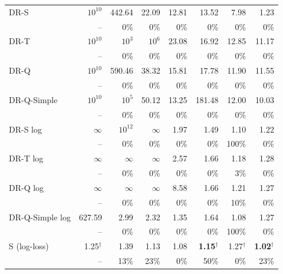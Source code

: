 \documentclass{article}
\begin{document}
\begin{table}[H]
\begin{tabular}{l|rrrrrrr}
\hline
DR-S & $10^{10}$ & 442.64 & 22.09 & 12.81 & 13.52 & 7.98 & 1.23 \\
 & \scriptsize -- & \scriptsize 0\% & \scriptsize 0\% & \scriptsize 0\% & \scriptsize 0\% & \scriptsize 0\% & \scriptsize 0\% \\[2pt]
DR-T & $10^{10}$ & $10^{3}$ & $10^{6}$ & 23.08 & 16.92 & 12.85 & 11.17 \\
 & \scriptsize -- & \scriptsize 0\% & \scriptsize 0\% & \scriptsize 0\% & \scriptsize 0\% & \scriptsize 0\% & \scriptsize 0\% \\[2pt]
DR-Q & $10^{10}$ & 590.46 & 38.32 & 15.81 & 17.78 & 11.90 & 11.55 \\
 & \scriptsize -- & \scriptsize 0\% & \scriptsize 0\% & \scriptsize 0\% & \scriptsize 0\% & \scriptsize 0\% & \scriptsize 0\% \\[2pt]
DR-Q-Simple & $10^{10}$ & $10^{5}$ & 50.12 & 13.25 & 181.48 & 12.00 & 10.03 \\
 & \scriptsize -- & \scriptsize 0\% & \scriptsize 0\% & \scriptsize 0\% & \scriptsize 0\% & \scriptsize 0\% & \scriptsize 0\% \\[2pt]
\hline
DR-S log & $\infty$ & $10^{12}$ & $\infty$ & 1.97 & 1.49 & 1.10 & 1.22 \\
 & \scriptsize -- & \scriptsize 0\% & \scriptsize 0\% & \scriptsize 0\% & \scriptsize 0\% & \scriptsize 100\% & \scriptsize 0\% \\[2pt]
DR-T log & $\infty$ & $\infty$ & $\infty$ & 2.57 & 1.66 & 1.18 & 1.28 \\
 & \scriptsize -- & \scriptsize 0\% & \scriptsize 0\% & \scriptsize 0\% & \scriptsize 0\% & \scriptsize 3\% & \scriptsize 0\% \\[2pt]
DR-Q log & $\infty$ & $\infty$ & $\infty$ & 8.58 & 1.66 & 1.21 & 1.27 \\
 & \scriptsize -- & \scriptsize 0\% & \scriptsize 0\% & \scriptsize 0\% & \scriptsize 0\% & \scriptsize 10\% & \scriptsize 0\% \\[2pt]
DR-Q-Simple log & 627.59 & 2.99 & 2.32 & 1.35 & 1.64 & 1.08 & 1.27 \\
 & \scriptsize -- & \scriptsize 0\% & \scriptsize 0\% & \scriptsize 0\% & \scriptsize 0\% & \scriptsize 100\% & \scriptsize 0\% \\[2pt]
\hline
S (log-loss) & 1.25$^\dagger$ & 1.39 & 1.13 & 1.08 & \textbf{1.15}$^\dagger$ & 1.27$^\dagger$ & \textbf{1.02}$^\dagger$ \\
 & \scriptsize -- & \scriptsize 13\% & \scriptsize 23\% & \scriptsize 0\% & \scriptsize 50\% & \scriptsize 0\% & \scriptsize 23\% \\[2pt]

\end{tabular}
\end{table}
\end{document}
